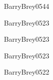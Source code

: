 \begin{syllabus}
\begin{unit}{\ARMultiprocessingDef}{}{BarryBrey05}{4}{4}
    \ARMultiprocessingAllTopics
    \ARMultiprocessingAllObjectives
\end{unit}

\begin{unit}{\ARPerformanceEnhancementsDef}{}{BarryBrey05}{2}{3}
    \ARPerformanceEnhancementsAllTopics
    \ARPerformanceEnhancementsAllObjectives
\end{unit}

\begin{unit}{\ARDistributedArchitecturesDef}{}{BarryBrey05}{2}{3}
    \ARDistributedArchitecturesAllTopics
    \ARDistributedArchitecturesAllObjectives
\end{unit}

\begin{unit}{\ARDevicesDef}{}{BarryBrey05}{2}{3}
    \ARDevicesAllTopics
    \ARDevicesAllObjectives
\end{unit}

\begin{unit}{\ARDirectionsInComputingDef}{}{BarryBrey05}{2}{2}
    \ARDirectionsInComputingAllTopics
    \ARDirectionsInComputingAllObjectives
\end{unit}

\begin{coursebibliography}
\end{coursebibliography}

\end{syllabus}
